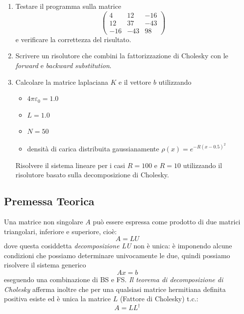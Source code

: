 \documentclass[11pt, a4paper]{article}
\begin{document}
\begin{enumerate}
    \item Testare il programma sulla matrice
    \[
    \begin{pmatrix}
    4 & 12 & -16 \\
    12 & 37 & -43 \\
    -16 & -43 & 98
    \end{pmatrix}
    \]
    e verificare la correttezza del risultato.
    
    \item Scrivere un risolutore che combini la fattorizzazione di Cholesky con le \textit{forward} e \textit{backward substitution}.
    
    \item Calcolare la matrice laplaciana $K$ e il vettore $b$ utilizzando
    \begin{itemize}
        \item $4\pi\varepsilon_0 = 1.0$
        \item $L = 1.0$
        \item $N = 50$
        \item densità di carica distribuita gaussianamente $\rho(x) = e^{-R(x-0.5)^2}$
    \end{itemize}
    
    Risolvere il sistema lineare per i casi $R = 100$ e $R = 10$ utilizzando il risolutore basato sulla decomposizione di Cholesky.
\end{enumerate}


\subsection{Premessa Teorica}
Una matrice non singolare $A$ può essere espressa come prodotto di due matrici triangolari, inferiore e superiore, cioè:
\[
A = LU
\]
dove questa cosiddetta \textit{decomposizione LU} non è unica: è imponendo alcune condizioni che possiamo determinare univocamente le due, quindi possiamo risolvere il sistema generico 
\[
Ax = b
\]
eseguendo una combinazione di BS e FS. \textit{Il teorema di decomposizione di Cholesky} afferma inoltre che per una qualsiasi matrice hermitiana definita positiva esiste ed è unica la matrice $L$ (Fattore di Cholesky) t.c.:
\[
A = LL^\dagger
\]
\end{document}
